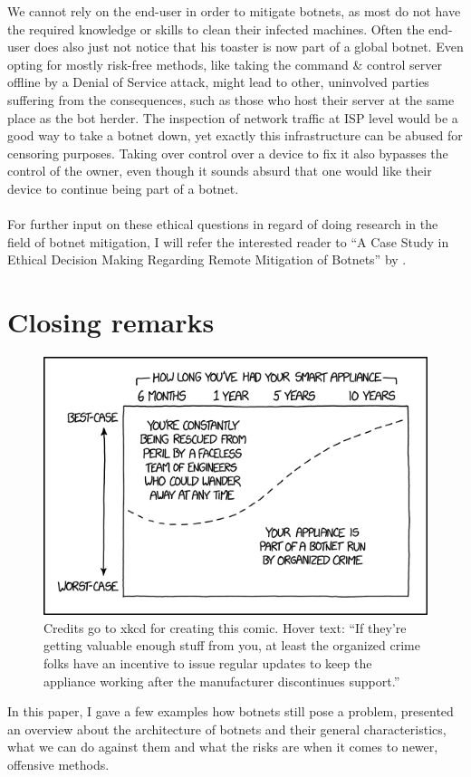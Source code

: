 \documentclass[10pt, a4paper, twocolumn]{article} %
\begin{document}
We cannot rely on the end-user in order to mitigate botnets, as most do not have the required knowledge or skills to clean their infected machines. Often the end-user does also just not notice that his toaster is now part of a global botnet. Even opting for mostly risk-free methods, like taking the command \& control server offline by a Denial of Service attack, might lead to other, uninvolved parties suffering from the consequences, such as those who host their server at the same place as the bot herder. The inspection of network traffic at ISP level would be a good way to take a botnet down, yet exactly this infrastructure can be abused for censoring purposes. Taking over control over a device to fix it also bypasses the control of the owner, even though it sounds absurd that one would like their device to continue being part of a botnet. \\\\
For further input on these ethical questions in regard of doing research in the field of botnet mitigation, I will refer the interested reader to ``A Case Study in Ethical Decision Making Regarding Remote Mitigation of Botnets''\cite{ethical} by \citeauthor{ethical}.

\section{Closing remarks}
\begin{figure}[ht]
  \centering
  \includegraphics[width=\linewidth]{figures/xkcd}
  \caption{Credits go to xkcd\cite{xkcd} for creating this comic. Hover text: ``If they're getting valuable enough stuff from you, at least the organized crime folks have an incentive to issue regular updates to keep the appliance working after the manufacturer discontinues support.''}
  \label{xkcd}
\end{figure} 
In this paper, I gave a few examples how botnets still pose a problem, presented an overview about the architecture of botnets and their general characteristics, what we can do against them and what the risks are when it comes to newer, offensive methods. \\\\
\end{document}
